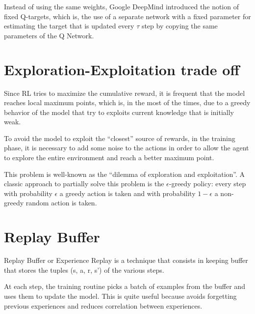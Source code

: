 \documentclass[Lau,oneside,noexaminfo]{sapthesis} %
\begin{document}
Instead of using the same weights, Google DeepMind introduced the notion of fixed Q-targets, which is, the use of a separate network with a fixed parameter for estimating the target that is updated every $\tau$ step by copying the same parameters of the Q Network.
\section{Exploration-Exploitation trade off}
Since RL tries to maximize the cumulative reward, it is frequent that the model reaches local maximum points, which is, in the most of the times, due to a greedy behavior of the model that try to exploits current knowledge that is initially weak.

To avoid the model to exploit the “closest” source of rewards, in the training phase, it is necessary to add some noise to the actions in order to allow the agent to explore the entire environment and reach a better maximum point.

This problem is well-known as the “dilemma of exploration and exploitation”. \cite{SUTTONBARTO} A classic approach to partially solve this problem is the $\epsilon$-greedy policy: every step with probability $\epsilon$ a greedy action is taken and with probability $1 - \epsilon$ a non-greedy random action is taken.  
\section{Replay Buffer}
Replay Buffer or Experience Replay is a technique that consists in keeping buffer that stores the tuples (s, a, r, s’) of the various steps. 

At each step, the training routine picks a batch of examples from the buffer and uses them to update the model. This is quite useful because avoids forgetting previous experiences and reduces correlation between experiences.
\end{document}
